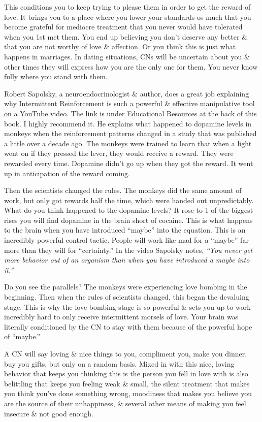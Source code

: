 \documentclass{article}
\numberwithin{equation}{section}
\begin{document}
This conditions you to keep trying to please them in order to get the reward of love. It brings you to a place where you lower your standards os much that you become grateful for mediocre treatment that you never would have tolerated when you 1st met them. You end up believing you don't deserve any better \& that you are not worthy of love \& affection. Or you think this is just what happens in marriages. In dating situations, CNs will be uncertain about you \& other times they will express how you are the only one for them. You never know fully where you stand with them.

Robert Sapolsky, a neuroendocrinologist \& author, does a great job explaining why Intermittent Reinforcement is such a powerful \& effective manipulative tool on a YouTube video. The link is under Educational Resources at the back of this book. I highly recommend it. He explains what happened to dopamine levels in monkeys when the reinforcement patterns changed in a study that was published a little over a decade ago. The monkeys were trained to learn that when a light went on if they pressed the lever, they would receive a reward. They were rewarded every time. Dopamine didn't go up when they got the reward. It went up in anticipation of the reward coming.

Then the scientists changed the rules. The monkeys did the same amount of work, but only got rewards half the time, which were handed out unpredictably. What do you think happened to the dopamine levels? It rose to 1 of the biggest rises you will find dopamine in the brain short of cocaine. This is what happens to the brain when you have introduced ``maybe'' into the equation. This is an incredibly powerful control tactic. People will work like mad for a ``maybe'' far more than they will for ``certainty.'' In the video Sapolsky notes, \textit{``You never get more behavior out of an organism than when you have introduced a maybe into it.''}

Do you see the parallels? The monkeys were experiencing love bombing in the beginning. Then when the rules of scientists changed, this began the devaluing stage. This is why the love bombing stage is so powerful \& sets you up to work incredibly hard to only receive intermittent morsels of love. Your brain was literally conditioned by the CN to stay with them because of the powerful hope of ``maybe.''

A CN will say loving \& nice things to you, compliment you, make you dinner, buy you gifts, but only on a random basis. Mixed in with this nice, loving behavior that keeps you thinking this is the person you fell in love with is also belittling that keeps you feeling weak \& small, the silent treatment that makes you think you've done something wrong, moodiness that makes you believe you are the source of their unhappiness, \& several other means of making you feel insecure \& not good enough.
\end{document}
